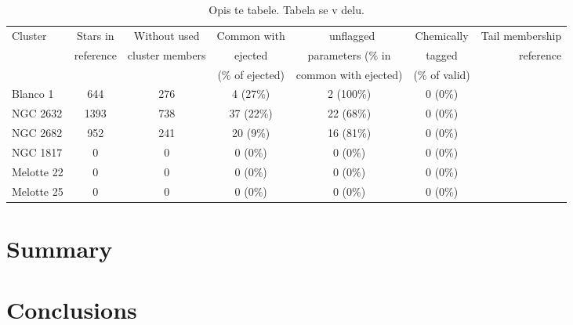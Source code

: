 \begin{table}
	\centering
	\caption{Opis te tabele. Tabela se v delu.}
	\begin{tabular}{l | c | c | c | c | c | r }
		\hline
		Cluster & Stars in & Without used & Common with & \Gh\ unflagged & Chemically & Tail membership\\
		 & reference & cluster members & ejected & parameters (\% in & tagged & reference\\
		 &  &  & (\% of ejected) & common with ejected) & (\% of valid) & \\
		\hline
		Blanco 1     & 644 & 276 & 4 (27\%) & 2 (100\%) & 0 (0\%) & \citet{2019arXiv191206657Z} \\
		NGC 2632  & 1393 & 738 & 37 (22\%) & 22 (68\%) & 0 (0\%) & \citet{2019AA...627A...4R} \\
		NGC 2682     & 952 & 241 & 20 (9\%) & 16 (81\%) & 0 (0\%) & \citet{2019AA...627A.119C} \\
		NGC 1817     & 0 & 0 & 0 (0\%) & 0 (0\%) & 0 (0\%) & \citet{a} \\
		Melotte 22   & 0 & 0 & 0 (0\%) & 0 (0\%) & 0 (0\%) & \citet{a} \\
		Melotte 25   & 0 & 0 & 0 (0\%) & 0 (0\%) & 0 (0\%) & \citet{2019AA...621L...3M} \\
		\hline
	\end{tabular}
	\label{tab:cluster_stats_tails}
\end{table}

\section{Summary}
\label{sec:clusters_summary}

\section{Conclusions}
\label{sec:clusters_conclusions}

